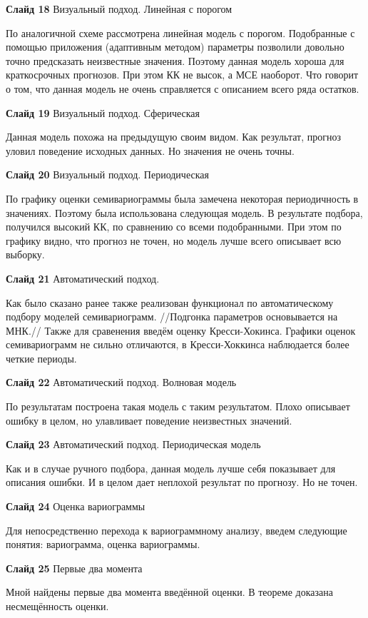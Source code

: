 \documentclass[a4paper,10pt]{report}
\begin{document}
\textbf{Слайд 18} Визуальный подход. Линейная с порогом

По аналогичной схеме рассмотрена линейная модель с порогом. Подобранные с помощью приложения (адаптивным методом) параметры позволили довольно точно предсказать неизвестные значения. Поэтому данная модель хороша для краткосрочных прогнозов. При этом КК не высок, а МСЕ наоборот. Что говорит о том, что данная модель не очень справляется с описанием всего ряда остатков.

\textbf{Слайд 19} Визуальный подход. Сферическая

Данная модель похожа на предыдущую своим видом. Как результат, прогноз уловил поведение исходных данных. Но значения не очень точны.

\textbf{Слайд 20} Визуальный подход. Периодическая

По графику оценки семивариограммы была замечена некоторая периодичность в значениях. Поэтому была использована следующая модель. В результате подбора, получился высокий КК, по сравнению со всеми подобранными. При этом по графику видно, что прогноз не точен, но модель лучше всего описывает всю выборку.

\textbf{Слайд 21} Автоматический подход.

Как было сказано ранее также реализован функционал по автоматическому подбору моделей семивариограмм. //Подгонка параметров основывается на МНК.// Также для сравенения введём оценку Кресси-Хокинса. Графики оценок семивариограмм не сильно отличаются, в Кресси-Хоккинса наблюдается более четкие периоды.

\textbf{Слайд 22} Автоматический подход. Волновая модель

По результатам построена такая модель с таким результатом. Плохо описывает ошибку в целом, но улавливает поведение неизвестных значений.

\textbf{Слайд 23} Автоматический подход. Периодическая модель

Как и в случае ручного подбора, данная модель лучше себя показывает для описания ошибки. И в целом дает неплохой результат по прогнозу. Но не точен.

\textbf{Слайд 24} Оценка вариограммы

Для непосредственно перехода к вариограммному анализу, введем следующие понятия: вариограмма, оценка вариограммы.

\textbf{Слайд 25} Первые два момента

Мной найдены первые два момента введённой оценки. В теореме доказана несмещённость оценки.
\end{document}
